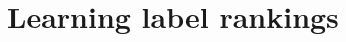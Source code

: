 \documentclass[a4paper,twoside,12pt,openright,notitlepage]{report}\usepackage[]{graphicx}\usepackage[]{color}
\begin{document}
\chapter{Learning label rankings}
\label{ch2}
%











\end{document}

